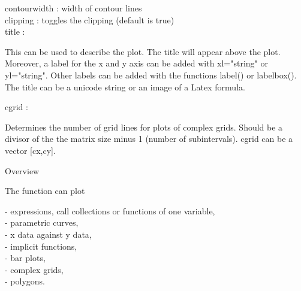 \documentclass[a4paper,10pt]{article}
\begin{document}
\begin{eulernotebook}
\begin{eulercomment}
\begin{eulercomment}
\begin{eulercomment}
\begin{eulercomment}
\begin{eulercomment}
\begin{eulercomment}
\begin{eulercomment}
\begin{eulercomment}
\begin{eulercomment}
contourwidth : width of contour lines\\
clipping  : toggles the clipping (default is true)\\
title     :\\
\end{eulercomment}
\begin{eulerttcomment}
  This can be used to describe the plot. The title will appear above
  the plot. Moreover, a label for the x and y axis can be added with
  xl="string" or yl="string". Other labels can be added with the
  functions label() or labelbox(). The title can be a unicode
  string or an image of a Latex formula.
\end{eulerttcomment}
\begin{eulercomment}
cgrid     :\\
\end{eulercomment}
\begin{eulerttcomment}
  Determines the number of grid lines for plots of complex grids.
  Should be a divisor of the the matrix size minus 1 (number of
  subintervals). cgrid can be a vector [cx,cy].
\end{eulerttcomment}
\begin{eulercomment}

Overview

The function can plot

- expressions, call collections or functions of one variable,\\
- parametric curves,\\
- x data against y data,\\
- implicit functions,\\
- bar plots,\\
- complex grids,\\
- polygons.


\end{eulercomment}
\end{eulercomment}
\end{eulercomment}
\end{eulercomment}
\end{eulercomment}
\end{eulercomment}
\end{eulercomment}
\end{eulercomment}
\end{eulercomment}
\end{eulernotebook}
\end{document}
